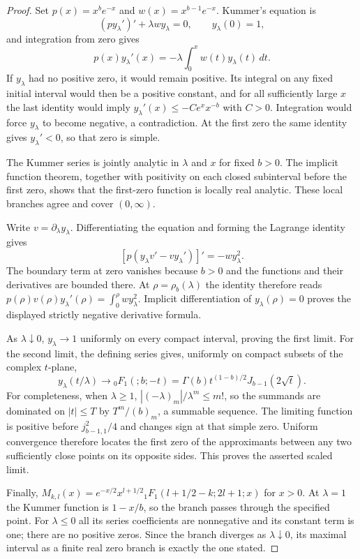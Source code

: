 \documentclass[11pt,a4paper]{article}
\theoremstyle{definition}
\theoremstyle{remark}
\numberwithin{equation}{section}
\begin{document}
\begin{proof}
Set $p(x)=x^be^{-x}$ and $w(x)=x^{b-1}e^{-x}$. Kummer's equation is
\[
 (p y_\lambda')'+\lambda w y_\lambda=0,\qquad
 y_\lambda(0)=1,
\]
and integration from zero gives
\[
 p(x)y_\lambda'(x)=-\lambda\int_0^xw(t)y_\lambda(t)\,dt.
\]
If $y_\lambda$ had no positive zero, it would remain positive. Its
integral on any fixed initial interval would then be a positive constant,
and for all sufficiently large $x$ the last identity would imply
$y_\lambda'(x)\leq-Ce^xx^{-b}$ with $C>0$. Integration would force
$y_\lambda$ to become negative, a contradiction. At the first zero the
same identity gives $y_\lambda'<0$, so that zero is simple.

The Kummer series is jointly analytic in $\lambda$ and $x$ for fixed
$b>0$. The implicit function theorem, together with positivity on each
closed subinterval before the first zero, shows that the first-zero
function is locally real analytic. These local branches agree and cover
$(0,\infty)$.

Write $v=\partial_\lambda y_\lambda$. Differentiating the equation and
forming the Lagrange identity gives
\[
 [p(y_\lambda v'-v y_\lambda')]'=-w y_\lambda^2.
\]
The boundary term at zero vanishes because $b>0$ and the functions and
their derivatives are bounded there. At $\rho=\rho_b(\lambda)$ the
identity therefore reads
$p(\rho)v(\rho)y_\lambda'(\rho)=\int_0^\rho w y_\lambda^2$.
Implicit differentiation of $y_\lambda(\rho)=0$ proves the displayed
strictly negative derivative formula.

As $\lambda\downarrow0$, $y_\lambda\to1$ uniformly on every compact
interval, proving the first limit. For the second limit, the defining
series gives, uniformly on compact subsets of the complex $t$-plane,
\[
 y_\lambda(t/\lambda)\longrightarrow
 {}_0F_1(;b;-t)
 =\Gamma(b)t^{(1-b)/2}J_{b-1}(2\sqrt t).
\]
For completeness, when $\lambda\geq1$,
$|(-\lambda)_m|/\lambda^m\leq m!$, so the summands are dominated on
$|t|\leq T$ by $T^m/(b)_m$, a summable sequence. The limiting function
is positive before $j_{b-1,1}^2/4$ and changes sign at that simple zero.
Uniform convergence therefore locates the first zero of the approximants
between any two sufficiently close points on its opposite sides.
This proves the asserted scaled limit.

Finally,
$M_{k,l}(x)=e^{-x/2}x^{l+1/2}
{}_1F_1(l+1/2-k;2l+1;x)$ for $x>0$. At $\lambda=1$ the Kummer function
is $1-x/b$, so the branch passes through the specified point. For
$\lambda\leq0$ all its series coefficients are nonnegative and its
constant term is one; there are no positive zeros. Since the branch
diverges as $\lambda\downarrow0$, its maximal interval as a finite real
zero branch is exactly the one stated.
\end{proof}
\end{document}
